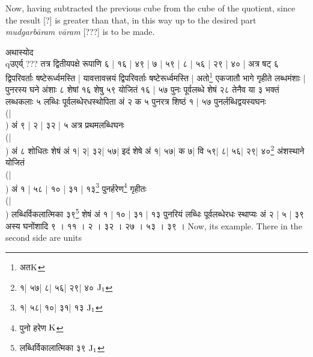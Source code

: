 \documentclass[11pt,a5paper]{book}
\begin{document}
Now, having subtracted the previous cube from the cube of the quotient, since
the result [?] is greater than that, in this way up to the desired part 
\textit{mudgarb\=ara\*m v\=ara\*m} [???] is to be made.
\newpage 

{\s अथास्योद \\qउएर्य् ??? 
तत्र द्वितीयपक्षे रूपाणि ६ | १६ | ४९ | ७ | ५९ | ८ | ५६ | २९ | ४० | 
अत्र षट् ६ द्विपरिवर्ताः षष्टेरूर्ध्वमस्ति | 
यावत्तावत्त्रयं द्विपरिवर्ताः षष्टेरूर्ध्वमस्ति | 
अतो\footnote{{\s अत}${\rm K}$} एकजातौ 
भागे गृहीते लब्धमंशाः | 
पुनरस्य घने अंशाः ८ शेषां १६ शेषु ५९ योजितं
१६ | ५७  पुनः पूर्वलब्धे शेषं २८ तेनैव या ३
भक्तं लब्धकलाः ५ लब्धिः पूर्वलब्धेरधस्थोपिता अं २
क ५ पुनरत्र शिष्ठं १ | ५७ पुनर्लब्धिद्वयस्यघनः\\(|\\)
अं ९ | २ | ३२ | ५ अत्र प्रथमलब्धिघनः\\(|\\)
अं ८ शोधितः शेषं अं १| २| ३२| ५७|
इदं शेषे अं १| ५७| क ७| वि ५९| ८| ५६| २९| ४०\footnote{{\s १| ५७| %
८| ५६| २९| ४० } ${\rm J_1}$}
अंशस्थाने योजितं \\(|\\) अं १ | ५८ | १० | ३१ | १३\footnote{{\s १| ५८| %
 १०| ३१| १३} ${\rm J_1}$}
पुनर्हरेण\footnote{{\s पुनो हरेण} ${\rm K}$}
गृहीतः \\(|\\)
लब्धिर्विकलात्मिका ३९\footnote{{\s लब्धिर्विकालात्मिका ३९ } ${\rm J_1}$}
शेषं अं १ | १० | ३१ | १३ पुनरियं लब्धिः पूर्वलब्धेरधः स्थाप्यः
अं २ | ५ | ३९
अस्य घनोंशादि ९ । ११ । २ । ३२ । २७ । ५३ । ३९ ।}
\newpage 
Now, its example. There in the second side are units 
\end{document}
